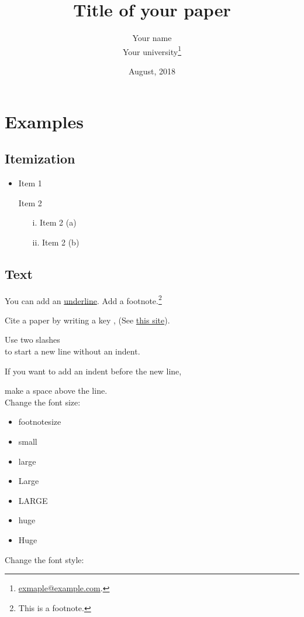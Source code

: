 \documentclass[11pt]{article}
\title{Title of your paper}
\author{Your name \\ Your university\thanks{\href{mailto:exmaple@example.com}{exmaple@example.com}.}}
\date{August, 2018}
\begin{document}
\maketitle
\tableofcontents %


\section{Examples}


\subsection{Itemization}

\begin{itemize}
\item Item 1
\item[] Item 2 %
	\begin{itemize}
	\item[i.] Item 2 (a)
	\item[ii.] Item 2 (b)
	\end{itemize}
\end{itemize}

\subsection{Text}

You can add an \underline{underline}. Add a footnote.\footnote{This is a footnote.} 

Cite a paper by writing a key \cite{ref1}, \citep{ref2} (See \href{http://merkel.texture.rocks/Latex/natbib.php}{this site}).

Use two slashes \\
to start a new line without an indent. 

If you want to add an indent before the new line, 

make a space above the line. \\
Change the font size:

\begin{itemize}
	\item {\footnotesize footnotesize}
	\item {\small small}
	\item {\large large}
	\item {\Large Large}
	\item {\LARGE LARGE}
	\item {\huge huge}
	\item {\Huge Huge}
\end{itemize}
Change the font style:
\end{document}
